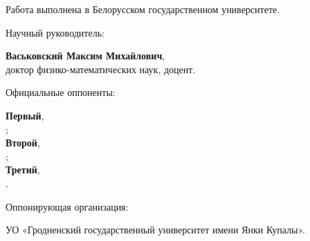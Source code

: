 \documentclass[_00_autoref.tex]{subfiles}
\begin{document}
\pagestyle{empty}
\setlength{\voffset}{-18mm}
\noindent Работа выполнена в Белорусском государственном университете.

\noindent
\begin{minipage}[t]{0.38\textwidth}
  \begin{flushleft}
    Научный руководитель:
  \end{flushleft}
\end{minipage}
\begin{minipage}[t]{0.61\textwidth}
  \begin{flushleft}
    \textbf{Васьковский Максим Михайлович},\\
    доктор физико-математических наук, доцент.
  \end{flushleft}
\end{minipage}

\medskip
\noindent
\begin{minipage}[t]{0.38\textwidth}
    \begin{flushleft}
        Официальные оппоненты:
    \end{flushleft}
\end{minipage}
\begin{minipage}[t]{0.61\textwidth}
    \begin{flushleft}
        \textbf{Первый},\\
        ;\\

        \textbf{Второй},\\
        ;\\

        \textbf{Третий},\\
        .\\
\medskip
  \end{flushleft}
\end{minipage}

\medskip
\noindent
\begin{minipage}[t]{0.38\textwidth}
    \begin{flushleft}
        Оппонирующая организация:
    \end{flushleft}
\end{minipage}
\begin{minipage}[t]{0.61\textwidth}
    \begin{flushleft}
        УО «Гродненский государственный университет имени Янки Купалы».
    \medskip
  \end{flushleft}
\end{minipage}
\end{document}
